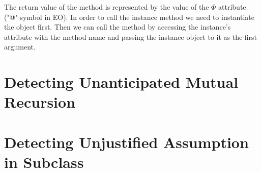 The return value of the method is represented by the value of the $\Phi$ attribute ("@" symbol in EO). In order to call the instance method we need to instantiate the object first. Then we can call the method by accessing the instance's attribute with the method name and passing the instance object to it as the first argument.

\section{Detecting Unanticipated Mutual Recursion}
\label{met:mutualrec}

\section{Detecting Unjustified Assumption in Subclass}
\label{met:unjustified}
